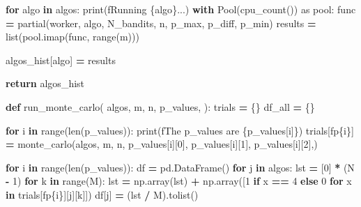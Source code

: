\documentclass[
]{book}
\newenvironment{Shaded}{\begin{snugshade}}{\end{snugshade}}
\newcommand{\BuiltInTok}[1]{#1}
\newcommand{\ControlFlowTok}[1]{\textcolor[rgb]{0.13,0.29,0.53}{\textbf{#1}}}
\newcommand{\DecValTok}[1]{\textcolor[rgb]{0.00,0.00,0.81}{#1}}
\newcommand{\ImportTok}[1]{#1}
\newcommand{\KeywordTok}[1]{\textcolor[rgb]{0.13,0.29,0.53}{\textbf{#1}}}
\newcommand{\NormalTok}[1]{#1}
\newcommand{\OperatorTok}[1]{\textcolor[rgb]{0.81,0.36,0.00}{\textbf{#1}}}
\newcommand{\SpecialCharTok}[1]{\textcolor[rgb]{0.00,0.00,0.00}{#1}}
\newcommand{\SpecialStringTok}[1]{\textcolor[rgb]{0.31,0.60,0.02}{#1}}
\theoremstyle{definition}
\theoremstyle{definition}
\theoremstyle{definition}
\theoremstyle{definition}
\theoremstyle{remark}
\begin{document}
\begin{Shaded}
\begin{Highlighting}[]
    \ControlFlowTok{for}\NormalTok{ algo }\KeywordTok{in}\NormalTok{ algos:}
        \BuiltInTok{print}\NormalTok{(}\SpecialStringTok{f\textquotesingle{}Running }\SpecialCharTok{\{}\NormalTok{algo}\SpecialCharTok{\}}\SpecialStringTok{...\textquotesingle{}}\NormalTok{)}
        \ControlFlowTok{with}\NormalTok{ Pool(cpu\_count()) }\ImportTok{as}\NormalTok{ pool:}
\NormalTok{            func }\OperatorTok{=}\NormalTok{ partial(worker, algo, N\_bandits, n, p\_max, p\_diff, p\_min)}
\NormalTok{            results }\OperatorTok{=} \BuiltInTok{list}\NormalTok{(pool.imap(func, }\BuiltInTok{range}\NormalTok{(m)))}

\NormalTok{        algos\_hist[algo] }\OperatorTok{=}\NormalTok{ results}

    \ControlFlowTok{return}\NormalTok{ algos\_hist}


\KeywordTok{def}\NormalTok{ run\_monte\_carlo(}
\NormalTok{        algos,}
\NormalTok{        m,}
\NormalTok{        n,}
\NormalTok{        p\_values,}
\NormalTok{):}
\NormalTok{    trials }\OperatorTok{=}\NormalTok{ \{\}}
\NormalTok{    df\_all }\OperatorTok{=}\NormalTok{ \{\}}

    \ControlFlowTok{for}\NormalTok{ i }\KeywordTok{in} \BuiltInTok{range}\NormalTok{(}\BuiltInTok{len}\NormalTok{(p\_values)):}
        \BuiltInTok{print}\NormalTok{(}\SpecialStringTok{f\textquotesingle{}The p\_values are }\SpecialCharTok{\{}\NormalTok{p\_values[i]}\SpecialCharTok{\}}\SpecialStringTok{\textquotesingle{}}\NormalTok{)}
\NormalTok{        trials[}\SpecialStringTok{f\textquotesingle{}p}\SpecialCharTok{\{}\NormalTok{i}\SpecialCharTok{\}}\SpecialStringTok{\textquotesingle{}}\NormalTok{] }\OperatorTok{=}\NormalTok{ monte\_carlo(algos,}
\NormalTok{                                      m,}
\NormalTok{                                      n,}
\NormalTok{                                      p\_values[i][}\DecValTok{0}\NormalTok{],}
\NormalTok{                                      p\_values[i][}\DecValTok{1}\NormalTok{],}
\NormalTok{                                      p\_values[i][}\DecValTok{2}\NormalTok{],)}

    \ControlFlowTok{for}\NormalTok{ i }\KeywordTok{in} \BuiltInTok{range}\NormalTok{(}\BuiltInTok{len}\NormalTok{(p\_values)):}
\NormalTok{        df }\OperatorTok{=}\NormalTok{ pd.DataFrame()}
        \ControlFlowTok{for}\NormalTok{ j }\KeywordTok{in}\NormalTok{ algos:}
\NormalTok{            lst }\OperatorTok{=}\NormalTok{ [}\DecValTok{0}\NormalTok{] }\OperatorTok{*}\NormalTok{ (N }\OperatorTok{{-}} \DecValTok{1}\NormalTok{)}
            \ControlFlowTok{for}\NormalTok{ k }\KeywordTok{in} \BuiltInTok{range}\NormalTok{(M):}
\NormalTok{                lst }\OperatorTok{=}\NormalTok{ np.array(lst) }\OperatorTok{+}\NormalTok{ np.array([}\DecValTok{1} \ControlFlowTok{if}\NormalTok{ x }\OperatorTok{==} \DecValTok{4} \ControlFlowTok{else} \DecValTok{0} \ControlFlowTok{for}\NormalTok{ x }\KeywordTok{in}\NormalTok{ trials[}\SpecialStringTok{f\textquotesingle{}p}\SpecialCharTok{\{}\NormalTok{i}\SpecialCharTok{\}}\SpecialStringTok{\textquotesingle{}}\NormalTok{][j][k]])}
\NormalTok{            df[j] }\OperatorTok{=}\NormalTok{ (lst }\OperatorTok{/}\NormalTok{ M).tolist()}


\end{Highlighting}
\end{Shaded}
\end{document}
